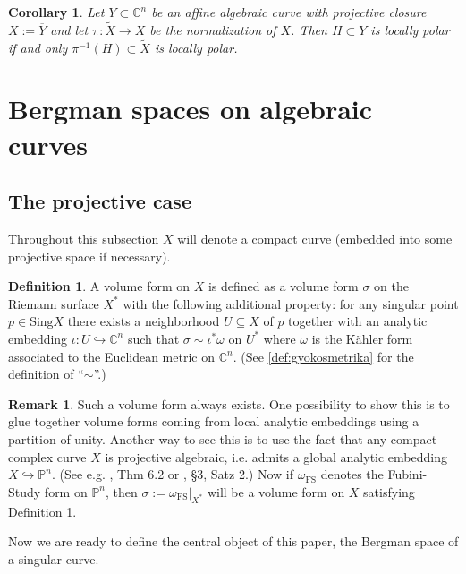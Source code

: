 \documentclass[11pt]{amsart}
\newtheorem{corollary}[theorem]{Corollary}
\theoremstyle{definition}
\newtheorem{definition}[theorem]{Definition}
\newtheorem{remark}[theorem]{Remark}
\newcommand{\bC}{{\mathbb C}}
\begin{document}
\begin{corollary}\label{rem:locpolgen}
    Let $Y \subset \bC^n$ be an affine algebraic curve with projective closure $X:=\overline{Y}$ and let $\pi : \widetilde{X} \to X$ be the normalization of $X$. Then $H\subset Y$ is locally polar if and only $\pi^{-1}(H) \subset \widetilde{X}$ is locally polar.
\end{corollary} 

\section{Bergman spaces on algebraic curves}

\subsection{The projective case} Throughout this subsection $X$ will denote a compact curve (embedded into some projective space if necessary).

\begin{definition}\label{def:vol}
    A volume form on $X$ is defined as a volume form $\sigma$ on the Riemann surface $X^*$ with the following additional property: for any singular point $p \in \text{Sing}X$ there exists a neighborhood $U\subseteq X$ of $p$ together with an analytic embedding $\iota:U \hookrightarrow \bC^n$ such that $\sigma \sim \iota^*\omega$ on $U^*$ where $\omega$ is the K\"ahler form associated to the Euclidean metric on $\bC^n$. (See \ref{def:gyokosmetrika} for the definition of ``$\sim$''.)
\end{definition}

\begin{remark}\label{rem:volformexistence}
    Such a volume form always exists. One possibility to show this is to glue together volume forms coming from local analytic embeddings using a partition of unity. Another way to see this is to use the fact that any compact complex curve $X$ is projective algebraic, i.e. admits a global analytic embedding $X \hookrightarrow \mathbb{P}^n$. (See e.g. \cite{RuppSera}, Thm 6.2 or \cite{Grauert}, §3, Satz 2.) Now if $\omega_{\text{FS}}$ denotes the Fubini-Study form on $\mathbb{P}^n$, then  $\sigma := \omega_{\text{FS}}\big|_{X^*}$ will be a volume form on $X$ satisfying Definition \ref{def:vol}.
\end{remark}

\noindent Now we are ready to define the central object of this paper, the Bergman space of a singular curve. 
\end{document}
